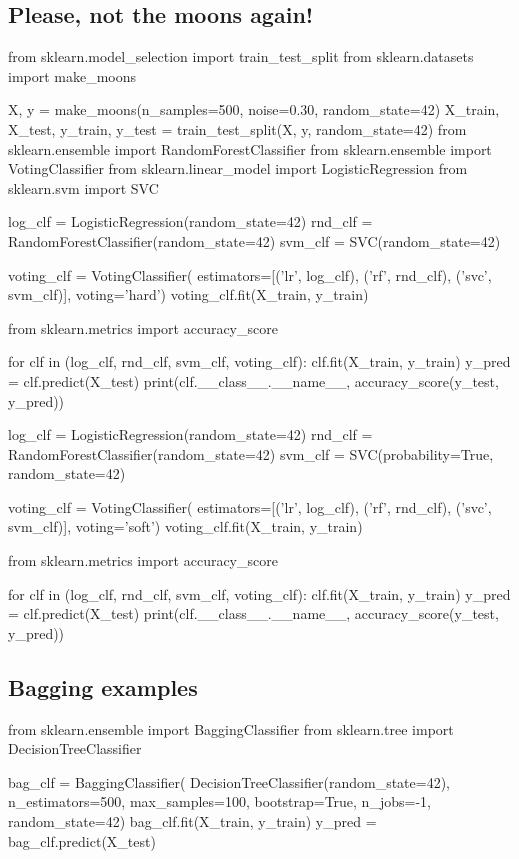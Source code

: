 \documentclass[%
oneside,                 %
final,                   %
10pt]{article}
\begin{document}
\subsection{Please, not the moons again!}
\bpycod
from sklearn.model_selection import train_test_split
from sklearn.datasets import make_moons

X, y = make_moons(n_samples=500, noise=0.30, random_state=42)
X_train, X_test, y_train, y_test = train_test_split(X, y, random_state=42)
from sklearn.ensemble import RandomForestClassifier
from sklearn.ensemble import VotingClassifier
from sklearn.linear_model import LogisticRegression
from sklearn.svm import SVC

log_clf = LogisticRegression(random_state=42)
rnd_clf = RandomForestClassifier(random_state=42)
svm_clf = SVC(random_state=42)

voting_clf = VotingClassifier(
    estimators=[('lr', log_clf), ('rf', rnd_clf), ('svc', svm_clf)],
    voting='hard')
voting_clf.fit(X_train, y_train)
\epycod

\bpycod
from sklearn.metrics import accuracy_score

for clf in (log_clf, rnd_clf, svm_clf, voting_clf):
    clf.fit(X_train, y_train)
    y_pred = clf.predict(X_test)
    print(clf.__class__.__name__, accuracy_score(y_test, y_pred))
\epycod

\bpycod
log_clf = LogisticRegression(random_state=42)
rnd_clf = RandomForestClassifier(random_state=42)
svm_clf = SVC(probability=True, random_state=42)

voting_clf = VotingClassifier(
    estimators=[('lr', log_clf), ('rf', rnd_clf), ('svc', svm_clf)],
    voting='soft')
voting_clf.fit(X_train, y_train)
\epycod

\bpycod
from sklearn.metrics import accuracy_score

for clf in (log_clf, rnd_clf, svm_clf, voting_clf):
    clf.fit(X_train, y_train)
    y_pred = clf.predict(X_test)
    print(clf.__class__.__name__, accuracy_score(y_test, y_pred))
\epycod

\subsection{Bagging examples}

\bpycod
from sklearn.ensemble import BaggingClassifier
from sklearn.tree import DecisionTreeClassifier

bag_clf = BaggingClassifier(
    DecisionTreeClassifier(random_state=42), n_estimators=500,
    max_samples=100, bootstrap=True, n_jobs=-1, random_state=42)
bag_clf.fit(X_train, y_train)
y_pred = bag_clf.predict(X_test)
\epycod
\end{document}
